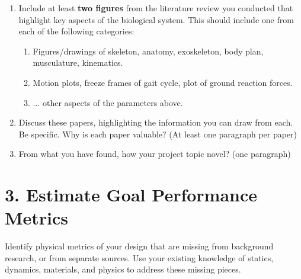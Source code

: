 \documentclass[12pt]{article}
\begin{document}
\begin{enumerate}
    \item Include at least \textbf{two figures} from the literature review you conducted that highlight key aspects of the biological system. This should include one from each of the following categories:
    \begin{enumerate}
        \item Figures/drawings of skeleton, anatomy, exoskeleton, body plan, musculature, kinematics.
        \item Motion plots, freeze frames of gait cycle, plot of ground reaction forces.
        \item ... other aspects of the parameters above.
    \end{enumerate}
    
    \item Discuss these papers, highlighting the information you can draw from each. Be specific. Why is each paper valuable? (At least one paragraph per paper)
    
    \item From what you have found, how your project topic novel? (one paragraph)
\end{enumerate}



\section*{3. Estimate Goal Performance Metrics}
Identify physical metrics of your design that are missing from background research, or from separate sources. Use your existing knowledge of statics, dynamics, materials, and physics to address these missing pieces.

\begin{center}
\end{center}

\begin{center}
\end{center}
\end{document}
